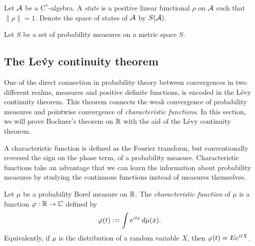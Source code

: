 \documentclass[12pt]{article}
\begin{document}
\begin{defn}[States]
Let $\mathcal{A}$ be a C$^*$-algebra.
A \emph{state} is a positive linear functional $\rho$ on $\mathcal{A}$ such that $\|\rho\|=1$.
Denote the space of states of $\mathcal{A}$ by $S(\mathcal{A})$.
\end{defn}


\begin{defn}
Let $S$ be a set of probability measures on a metric space $S$.
\end{defn}
\begin{thm}

\end{thm}



\subsection{The Le\'vy continuity theorem}

One of the direct connection in probability theory between convergences in two different realms, measures and positive definite functions, is encoded in the L\'evy continuity theorem.
This theorem connects the weak convergence of probability measures and pointwise convergence of \emph{characteristic functions}.
In this section, we will prove Bochner's theorem on $\mathbb{R}$ with the aid of the L\'evy continuity theorem.

A characteristic function is defined as the Fourier transform, but conventionally reversed the sign on the phase term, of a probability measure.
Characteristic functions take an advantage that we can learn the information about probability measures by studying the continuous functions instead of measures themselves.

\begin{defn}
Let $\mu$ be a probability Borel measure on $\mathbb{R}$.
The \emph{characteristic function} of $\mu$ is a function $\varphi:\mathbb{R}\to\mathbb{C}$ defined by
\[\varphi(t):=\int e^{itx}\,d\mu(x).\]
Equivalently, if $\mu$ is the distribution of a random variable $X$, then $\varphi(t)=Ee^{itX}$.
\end{defn}
\end{document}
